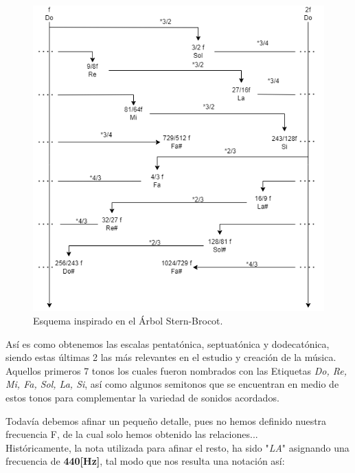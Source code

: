 \documentclass{book}
\begin{document}
	\begin{figure}[!b]
		\begin{center}
			\includegraphics[width=\textwidth]{Assets/images/Stern-Brocot}
			\caption{Esquema inspirado en el Árbol Stern-Brocot.~\cite{teoriasescalas2013}}
			\label{Stern-Brocot}
		\end{center}
	\end{figure}
	\pagebreak
	Así es como obtenemos las escalas pentatónica, septuatónica y dodecatónica, siendo estas últimas 2 las más relevantes en el estudio y creación de la música. Aquellos primeros 7 tonos los cuales fueron nombrados con las Etiquetas \emph{Do, Re, Mi, Fa, Sol, La, Si}, así como algunos semitonos que se encuentran en medio de estos tonos para complementar la variedad de sonidos acordados.\par 
	Todavía debemos afinar un pequeño detalle, pues no hemos definido nuestra frecuencia F, de la cual solo hemos obtenido las relaciones...\\
	Históricamente, la nota utilizada para afinar el resto, ha sido "\emph{LA}" asignando una frecuencia de \textbf{440[Hz]}, tal modo que nos resulta una notación así:
\end{document}
